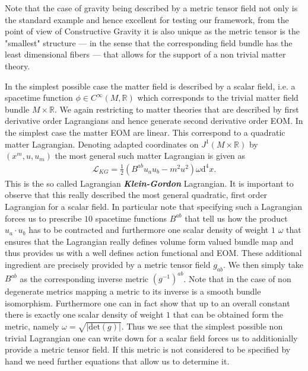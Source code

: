 \documentclass[a4paper,12pt, DIV=14, BCOR=5mm, twoside, headsepline, numbers=noenddot]{scrbook}
\begin{document}
Note that the case of gravity being described by a metric tensor field not only is the standard example and hence excellent for testing our framework, from the point of view of Constructive Gravity it is also unique as the metric tensor is the "smallest" structure --- in the sense that the corresponding field bundle has the least dimensional fibers --- that allows for the support of a non trivial matter theory.

In the simplest possible case the matter field is described by a scalar field, i.e. a spacetime function $\phi \in C^{\infty}(M,\mathbb{R})$ which corresponds to the trivial matter field bundle $M \times \mathbb{R}$. We again restricting to matter theories that are described by first derivative order Lagrangians and hence generate second derivative order EOM. In the simplest case the matter EOM are linear. This correspond to a quadratic matter Lagrangian. Denoting adapted coordinates on $J^1(M \times \mathbb{R})$ by $(x^m,u,u_m)$ the most general such matter Lagrangian is given as
\begin{align}\label{KGL}
    \mathcal{L}_{KG} = \frac{1}{2} \left ( B^{ab} u_a u_b - m^2 u^2\right )\omega \mathrm{d}^4x.
\end{align}
This is the so called Lagrangian \textit{\textbf{Klein-Gordon}} Lagrangian. It is important to observe that this really described the most general quadratic, first order Lagrangian for a scalar field. 
In particular note that specifying such a Lagrangian forces us to prescribe $10$ spacetime functions $B^{ab}$ that tell us how the product $u_a\cdot u_b$ has to be contracted and furthermore one scalar density of weight $1$ $\omega$ that ensures that the Lagrangian really defines volume form valued bundle map and thus provides us with a well defines action functional and EOM.
These additional ingredient are precisely provided by a metric tensor field $g_{ab}$. We then simply take $B^{ab}$ as the corresponding inverse metric $(g^{-1})^{ab}$. Note that in the case of non degenerate metrics mapping a metric to its inverse is a smooth bundle isomorphism. Furthermore one can in fact show that up to an overall constant there is exactly one scalar density of weight $1$ that can be obtained form the metric, namely $\omega = \sqrt{ \vert \mathrm{det}(g) \vert }$. 
Thus we see that the simplest possible non trivial Lagrangian one can write down for a scalar field forces us to additionially provide a metric tensor field. If this metric is not considered to be specified by hand we need further equations that allow us to determine it.  
\end{document}
